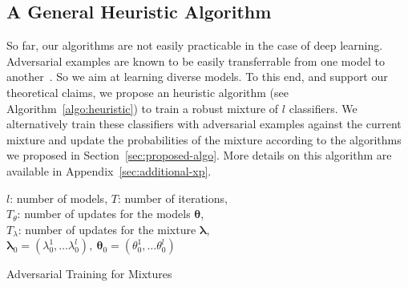 \subsection{A General Heuristic Algorithm}

So far, our algorithms are not easily practicable in the case of deep learning. Adversarial examples are known to be easily transferrable from one model to another~\citep{tramer2017space,papernot2016transferability}. So we aim at learning diverse models. To this end, and support our theoretical claims, we propose an heuristic algorithm (see Algorithm~\ref{algo:heuristic}) to train a robust mixture of $l$ classifiers.   We alternatively train these classifiers with adversarial examples against the current mixture and update the probabilities of the mixture according to the algorithms we proposed in Section~\ref{sec:proposed-algo}. More details on this algorithm are available in Appendix~\ref{sec:additional-xp}. 


\begin{algorithm}[h!]
\small
\SetAlgoLined
$l$: number of models, $T$: number of iterations,\\
$T_\theta$: number of updates for the models $\bm{\theta}$,\\
$T_\lambda$: number of updates for the mixture $\bm{\lambda}$,\\ $\bm{\lambda}_0=(\lambda_0^1,\dots\lambda_0^l),~\bm{\theta}_0=(\theta_0^1,\dots\theta_0^l)$\\
 \caption{Adversarial Training for Mixtures}
 
 \label{algo:heuristic}
\end{algorithm}
